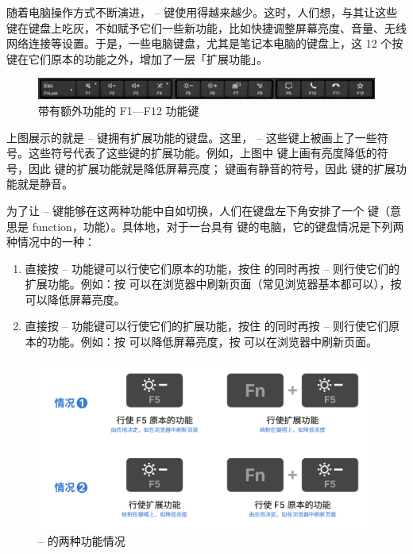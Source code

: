 随着电脑操作方式不断演进， --  键使用得越来越少。这时，人们想，与其让这些键在键盘上吃灰，不如赋予它们一些新功能，比如快捷调整屏幕亮度、音量、无线网络连接等设置。于是，一些电脑键盘，尤其是笔记本电脑的键盘上，这 12 个按键在它们原本的功能之外，增加了一层「扩展功能」。

\begin{figure}[htb!]
  \centering
  \includegraphics[width=.9\textwidth]{assets/basic/F1_to_F12_keys_with_extra_functions.png}
  \caption{带有额外功能的 F1—F12 功能键}
  \label{fig:F1_to_F12_keys_with_extra_functions}
\end{figure}

上图展示的就是  --  键拥有扩展功能的键盘。这里， --  这些键上被画上了一些符号。这些符号代表了这些键的扩展功能。例如，上图中  键上画有亮度降低的符号，因此  键的扩展功能就是降低屏幕亮度；  键画有静音的符号，因此  键的扩展功能就是静音。

为了让  --  键能够在这两种功能中自如切换，人们在键盘左下角安排了一个  键（意思是 function，功能）。具体地，对于一台具有  键的电脑，它的键盘情况是下列两种情况中的一种：

\begin{enumerate}
  \item 直接按  --  功能键可以行使它们原本的功能，按住  的同时再按  --  则行使它们的扩展功能。例如：按  可以在浏览器中刷新页面（常见浏览器基本都可以），按  可以降低屏幕亮度。
  \item 直接按  --  功能键可以行使它们的扩展功能，按住  的同时再按  --  则行使它们原本的功能。例如：按  可以降低屏幕亮度，按  可以在浏览器中刷新页面。
\end{enumerate}

\begin{figure}[htb!]
  \centering
  \includegraphics[width=.8\textwidth]{assets/basic/Fn_functions.pdf}
  \caption{ --  的两种功能情况}
  \label{fig:Fn_functions}
\end{figure}

